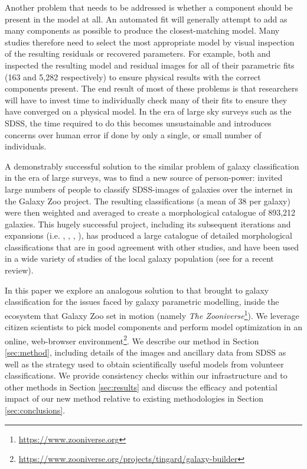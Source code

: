 \documentclass[trackchanges]{aastex63}
\begin{document}
Another problem that needs to be addressed is whether a component should be present in the model at all. An automated fit will generally attempt to add as many components as possible to produce the closest-matching model. Many studies therefore need to select the most appropriate model by visual inspection of the resulting residuals or recovered parameters. For example, both \citet{Vika2014:1408.4070v1} and \citet{2018MNRAS.473.4731K} inspected the resulting model and residual images for all of their parametric fits (163 and 5,282 respectively) to ensure physical results with the correct components present. The end result of most of these problems is that researchers will have to invest time to individually check many of their fits to ensure they have converged on a physical model. In the era of large sky surveys such as the SDSS, the time required to do this becomes unsustainable and introduces concerns over human error if done by only a single, or small number of individuals.

A demonstrably successful solution to the similar problem of galaxy classification in the era of large surveys, was to find a new source of person-power: \cite{Lintott2008:0804.4483v1} invited large numbers of people to classify SDSS-images of galaxies over the internet in the Galaxy Zoo project. The resulting classifications (a mean of 38 per galaxy) were then weighted and averaged to create a morphological catalogue of 893,212 galaxies. This hugely successful project, including its subsequent iterations and expansions (i.e. \citealt{Willett2013:1308.3496v2}, \citealt{Hart2016:1607.01019v1}, \citealt{2017MNRAS.464.4176W}, \citealt{2017MNRAS.464.4420S}), has produced a large catalogue of detailed morphological classifications that are in good agreement with other studies, and have been used in a wide variety of studies of the local galaxy population (see \citealt{2019arXiv191008177M} for a recent review).

In this paper we explore an analogous solution to that \citet{Lintott2008:0804.4483v1} brought to galaxy classification for the issues faced by galaxy parametric modelling, inside the ecosystem that Galaxy Zoo set in motion (namely {\it The Zooniverse}\footnote{\url{https://www.zooniverse.org}}). We leverage citizen scientists to pick model components and perform model optimization in an online, web-browser environment\footnote{\url{https://www.zooniverse.org/projects/tingard/galaxy-builder}}. We describe our method in Section \ref{sec:method}, including details of the images and ancillary data from SDSS as well as the strategy used to obtain scientifically useful models from volunteer classifications. We provide consistency checks within our infrastructure and to other methods in Section \ref{sec:results} and discuss the efficacy and potential impact of our new method relative to existing methodologies in Section \ref{sec:conclusions}.
\end{document}
